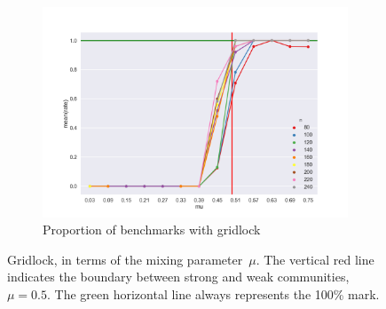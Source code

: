 \begin{figure}
    \begin{subfigure}[b]{0.30\textwidth}
        \includegraphics[width=\textwidth]{fig/rate_vs_mu}
        \caption{Proportion of benchmarks with gridlock}
        \label{fig:mouse}
    \end{subfigure}

  \caption{Gridlock, in terms of the mixing parameter~$\mu$. The vertical red line indicates the boundary between strong and weak communities, $\mu = 0.5$. The green horizontal line always represents the 100\% mark.}
  \label{fig:mu_gridlock}
\end{figure}

